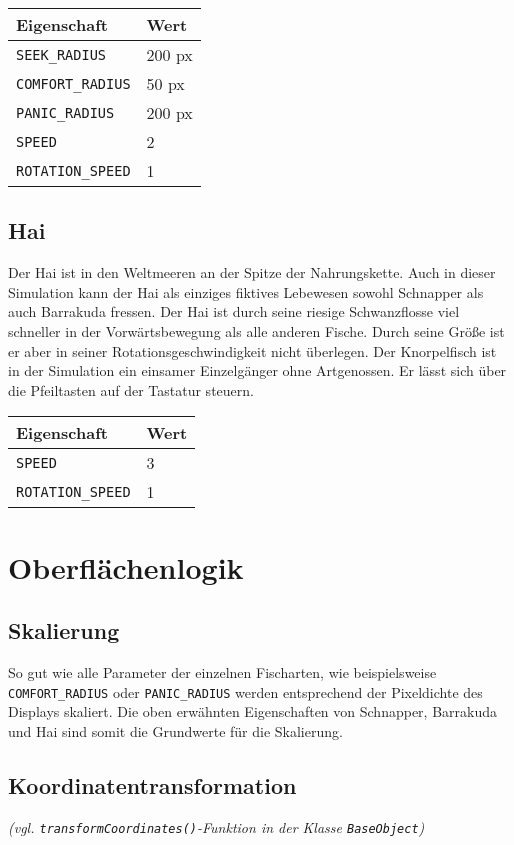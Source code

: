 \documentclass[11pt]{article}
\begin{document}
\begin{tabular}{|l|l|}
\hline
	\textbf{Eigenschaft} & \textbf{Wert}\\
\hline
\hline
	\lstinline[]$SEEK_RADIUS$  & 200 px\\
\hline
	\lstinline[]$COMFORT_RADIUS$ & 50 px\\
\hline
	\lstinline[]$PANIC_RADIUS$ & 200 px\\
\hline
	\lstinline[]$SPEED$ & 2\\
\hline
	\lstinline[]$ROTATION_SPEED$ & 1\\
\hline
\end{tabular}

\subsection{Hai}
Der Hai ist in den Weltmeeren an der Spitze der Nahrungskette. Auch in dieser Simulation kann der Hai als einziges fiktives Lebewesen sowohl Schnapper als auch Barrakuda fressen. Der Hai ist durch seine riesige Schwanzflosse viel schneller in der Vorwärtsbewegung als alle anderen Fische. Durch seine Größe ist er aber in seiner Rotationsgeschwindigkeit nicht überlegen. Der Knorpelfisch ist in der Simulation ein einsamer Einzelgänger ohne Artgenossen. Er lässt sich über die Pfeiltasten auf der Tastatur steuern.\\

\begin{tabular}{|l|l|}
\hline
	\textbf{Eigenschaft} & \textbf{Wert}\\
\hline
\hline
	\lstinline[]$SPEED$ & 3\\
\hline
	\lstinline[]$ROTATION_SPEED$ & 1\\
\hline
\end{tabular}

\section{Oberflächenlogik}
\subsection{Skalierung}
So gut wie alle Parameter der einzelnen Fischarten, wie beispielsweise \lstinline[]$COMFORT_RADIUS$ oder \lstinline[]$PANIC_RADIUS$ werden entsprechend der Pixeldichte des Displays skaliert. Die oben erwähnten Eigenschaften von Schnapper, Barrakuda und Hai sind somit die Grundwerte für die Skalierung.

\subsection{Koordinatentransformation}
\textit{(vgl. \lstinline{transformCoordinates()}-Funktion in der Klasse \lstinline{BaseObject})}
\end{document}
